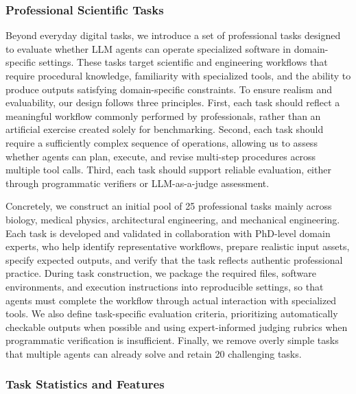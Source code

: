 \subsubsection{Professional Scientific Tasks}\label{sec:pro-tasks}
Beyond everyday digital tasks, we introduce a set of professional tasks designed to evaluate whether LLM agents can operate specialized software in domain-specific settings. These tasks target scientific and engineering workflows that require procedural knowledge, familiarity with specialized tools, and the ability to produce outputs satisfying domain-specific constraints. To ensure realism and evaluability, our design follows three principles. First, each task should reflect a meaningful workflow commonly performed by professionals, rather than an artificial exercise created solely for benchmarking. Second, each task should require a sufficiently complex sequence of operations, allowing us to assess whether agents can plan, execute, and revise multi-step procedures across multiple tool calls. Third, each task should support reliable evaluation, either through programmatic verifiers or LLM-as-a-judge assessment.

Concretely, we construct an initial pool of 25 professional tasks mainly across biology, medical physics, architectural engineering, and mechanical engineering. Each task is developed and validated in collaboration with PhD-level domain experts, who help identify representative workflows, prepare realistic input assets, specify expected outputs, and verify that the task reflects authentic professional practice. During task construction, we package the required files, software environments, and execution instructions into reproducible settings, so that agents must complete the workflow through actual interaction with specialized tools. We also define task-specific evaluation criteria, prioritizing automatically checkable outputs when possible and using expert-informed judging rubrics when programmatic verification is insufficient. Finally, we remove overly simple tasks that multiple agents can already solve and retain 20 challenging tasks.

\subsubsection{Task Statistics and Features}

